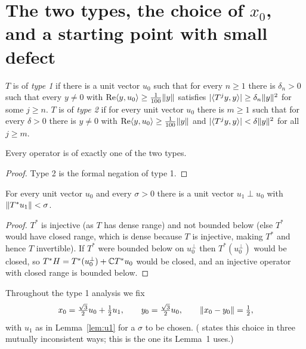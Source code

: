 \section{\texorpdfstring{The two types, the choice of $x_0$, and a starting point with small defect}{The two types and a starting point with small defect}}
\label{sec:start}

\begin{definition}[\paper{}, p.~7]\label{def:types}
$T$ is of \emph{type 1} if there is a unit vector $u_0$ such that for every $n\ge1$ there is
$\delta_n>0$ such that every $y\ne0$ with $\operatorname{Re}\langle y,u_0\rangle\ge\frac1{100}\lVert y\rVert$ satisfies
$\lvert \langle T^jy,y\rangle\rvert\ge\delta_n\lVert y\rVert^2$ for some $j\ge n$. $T$ is of \emph{type 2} if for every
unit vector $u_0$ there is $m\ge1$ such that for every $\delta>0$ there is $y\ne0$ with
$\operatorname{Re}\langle y,u_0\rangle\ge\frac1{100}\lVert y\rVert$ and $\lvert \langle T^jy,y\rangle\rvert<\delta\lVert y\rVert^2$ for all $j\ge m$.
\end{definition}

\begin{lemma}\stproved{}
Every operator is of exactly one of the two types.
\end{lemma}
\begin{proof}
Type 2 is the formal negation of type 1.
\end{proof}

\begin{lemma}\label{lem:u1}\stproved{}
For every unit vector $u_0$ and every $\sigma>0$ there is a unit vector $u_1\perp u_0$ with
$\lVert T^*u_1\rVert<\sigma$.
\end{lemma}
\begin{proof}
$T^*$ is injective (as $T$ has dense range) and not bounded below (else $T^*$ would have closed
range, which is dense because $T$ is injective, making $T^*$ and hence $T$ invertible). If $T^*$
were bounded below on $u_0^\perp$ then $T^*(u_0^\perp)$ would be closed, so
$T^*H=T^*(u_0^\perp)+\mathbb{C} T^*u_0$ would be closed, and an injective operator with closed range is
bounded below.
\end{proof}

Throughout the type 1 analysis we fix
\begin{equation}\label{eq:x0}
x_0=\tfrac{\sqrt3}{2}u_0+\tfrac12u_1,\qquad y_0=\tfrac{\sqrt3}{2}u_0,\qquad
\lVert x_0-y_0\rVert=\tfrac12 ,
\end{equation}
with $u_1$ as in Lemma~\ref{lem:u1} for a $\sigma$ to be chosen. (\paper{} states this choice
in three mutually inconsistent ways; this is the one its Lemma~1 uses.)

